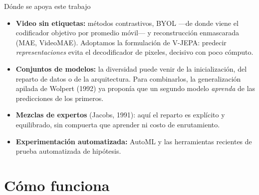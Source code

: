 \documentclass[aspectratio=169,10pt]{beamer}
\begin{document}
\begin{frame}{Dónde se apoya este trabajo}
  \small
  \begin{itemize}
    \item \textbf{Video sin etiquetas:} métodos contrastivos, BYOL ---de donde
          viene el codificador objetivo por promedio móvil--- y reconstrucción
          enmascarada (MAE, VideoMAE). Adoptamos la formulación de
          \alert{V-JEPA}: predecir \emph{representaciones} evita el
          decodificador de pixeles, decisivo con poco cómputo.
    \item \textbf{Conjuntos de modelos:} la diversidad puede venir de la
          inicialización, del reparto de datos o de la arquitectura. Para
          combinarlos, la \alert{generalización apilada} de Wolpert (1992) ya
          proponía que un segundo modelo \emph{aprenda} de las predicciones de
          los primeros.
    \item \textbf{Mezclas de expertos} (Jacobs, 1991): aquí el reparto es
          \alert{explícito y equilibrado}, sin compuerta que aprender ni costo
          de enrutamiento.
    \item \textbf{Experimentación automatizada:} AutoML y las herramientas
          recientes de prueba automatizada de hipótesis.
  \end{itemize}
\end{frame}

\section{Cómo funciona}
\end{document}
